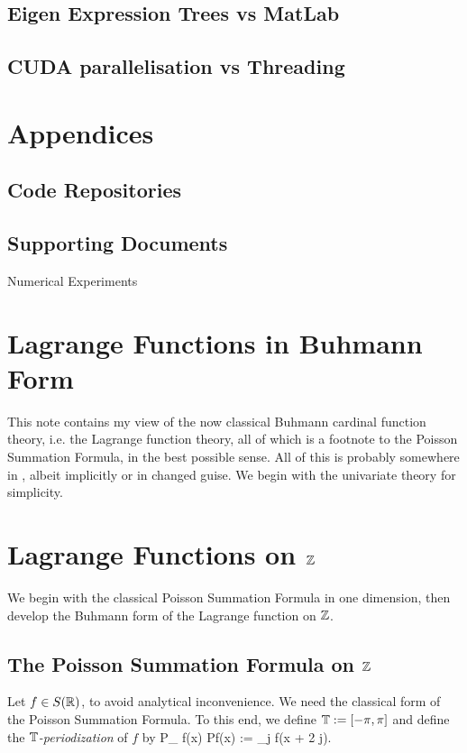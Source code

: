 \documentclass[a4paper]{amsart}
\begin{document}
\subsection{Eigen Expression Trees vs MatLab}

\subsection{CUDA parallelisation vs Threading}


\section{Appendices}

\subsection{Code Repositories}

\subsection{Supporting Documents}
 

Numerical Experiments

\section{Lagrange Functions in Buhmann Form}
This note contains my view of the now classical Buhmann cardinal
function theory, i.e. the Lagrange function theory, all of which is
a footnote to the Poisson Summation Formula, in the best possible
sense. All of this is probably somewhere in \cite{mdb}, albeit
implicitly or in changed guise. We begin with the univariate theory
for simplicity.

\section{Lagrange Functions on ${\mathbb Z}$}

We begin with the classical Poisson Summation Formula in one
dimension, then develop the Buhmann form of the Lagrange function on ${\mathbb Z}$.

\subsection{The Poisson Summation Formula on ${\mathbb Z}$}

Let $f \in S({\mathbb R})$, to avoid analytical inconvenience.  We need the
classical form of the Poisson Summation Formula. To this end, we
define ${\mathbb T} := [-\pi, \pi]$ and define the {\em ${\mathbb T}$-periodization}
of $f$ by
\be
P_{\TT} f(x) \equiv P\!f(x) := \sum_{j \in \ZZ} f(x + 2 \pi j).
\label{PSF0}
\ee
\end{document}
